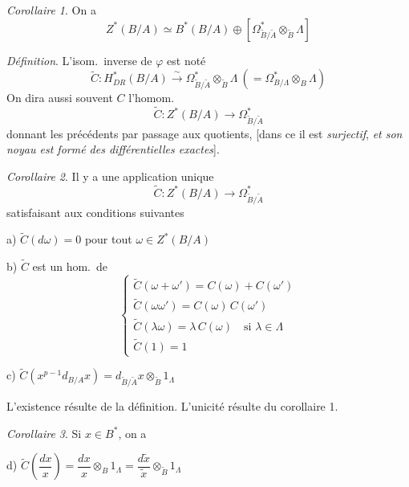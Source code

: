 \documentclass[11pt,a4paper]{article}
\begin{document}
\emph{Corollaire 1}. On a \struck{\ill{}}
\[
Z^{*}(B/A) \simeq B^{*}(B/A) \oplus [\Omega^{*}_{\widetilde{B}/\widetilde{A}} \otimes_{\widetilde{B}} \Lambda]
\]

\emph{Définition}. L'isom.\ inverse de $\varphi$ est noté
\[
\boxed{\widetilde{C} : H^{*}_{DR}(B/A) \xrightarrow{\sim} \Omega^{*}_{\widetilde{B}/\widetilde{A}} \otimes_{\widetilde{B}} \Lambda \ (= \Omega^{*}_{B/\Lambda} \otimes_{B} \Lambda)}
\]
On dira aussi souvent $C$ l'homom.
\[
\widetilde{C} : Z^{*}(B/A) \to \Omega^{*}_{\widetilde{B}/\widetilde{A}}
\]
donnant les précédents par passage aux quotients, [dans ce  il est \emph{surjectif}, \emph{et son noyau est formé des différentielles exactes}].

\emph{Corollaire 2}. Il y a une application unique
\[
\widetilde{C} : Z^{*}(B/A) \to \Omega^{*}_{\widetilde{B}/\widetilde{A}}
\]
satisfaisant aux conditions suivantes

a) $\widetilde{C}(d\omega) = 0$ pour tout $\omega \in Z^{*}(B/A)$

b) $\widetilde{C}$ est un hom.\ de  
\[
\begin{cases} \widetilde{C}(\omega + \omega') = C(\omega) + C(\omega') \\ \widetilde{C}(\omega\omega') = C(\omega)\,C(\omega') \\ \widetilde{C}(\lambda\omega) = \lambda\,C(\omega) \quad \text{si } \lambda \in \Lambda \\ \widetilde{C}(1) = 1 \end{cases}
\]

c) $\widetilde{C}(x^{p-1}d_{B/A}x) = d_{\widetilde{B}/\widetilde{A}}x \otimes_{\widetilde{B}} 1_{\Lambda}$


L'existence résulte de la définition. L'unicité résulte du corollaire 1.

\emph{Corollaire 3}. Si $x \in B^{*}$, on a

d) $\widetilde{C}\left(\dfrac{dx}{x}\right) = \dfrac{dx}{x} \otimes_{B} 1_{\Lambda} = \dfrac{d\widetilde{x}}{\widetilde{x}} \otimes_{\widetilde{B}} 1_{\Lambda}$
\end{document}
